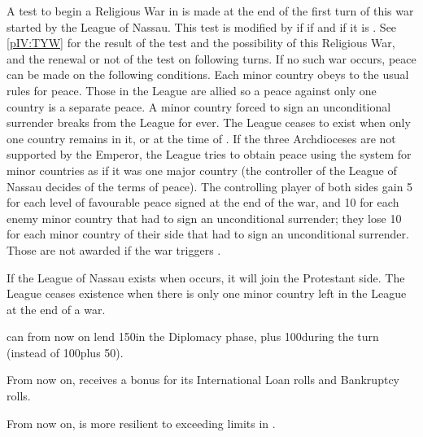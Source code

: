 \phpaix
\aparag A test to begin a Religious War in \HRE is made at the end of the
first turn of this war started by the League of Nassau.  This test is modified
by  if \SPA if \CATHCR and  if it is \CATHCO. See
\ref{pIV:TYW} for the result of the test and the possibility of this Religious
War, and the renewal or not of the test on following turns.  If no such war
occurs, peace can be made on the following conditions.
\aparag Each minor country obeys to the usual rules for peace. Those in the
League are allied so a peace against only one country is a separate peace.
\aparag A minor country forced to sign an unconditional surrender breaks from
the League for ever. The League ceases to exist when only one country remains
in it, or at the time of .
\aparag If the three Archdioceses are not supported by the Emperor, the League
tries to obtain peace using the system for minor countries as if it was one
major country (the controller of the League of Nassau decides of the terms of
peace).
\aparag The controlling player of both sides gain 5 \PV for each level of
favourable peace signed at the end of the war, and 10 \PV for each enemy minor
country that had to sign an unconditional surrender; they lose 10 \PV for each
minor country of their side that had to sign an unconditional surrender.
Those \PV are not awarded if the war triggers .

\effetlong
\aparag If the League of Nassau exists when  occurs, it will
join the Protestant side. The League ceases existence when there is only one
minor country left in the League at the end of a war.





\effetlong
\aparag \HOL can from now on lend 150\ducats in the Diplomacy phase, plus
100\ducats during the turn (instead of 100\ducats plus 50\ducats).

\aparag From now on, \HOL receives a bonus for its International Loan rolls
and Bankruptcy rolls.

\aparag From now on, \HOL is more resilient to exceeding limits in \MNU.




